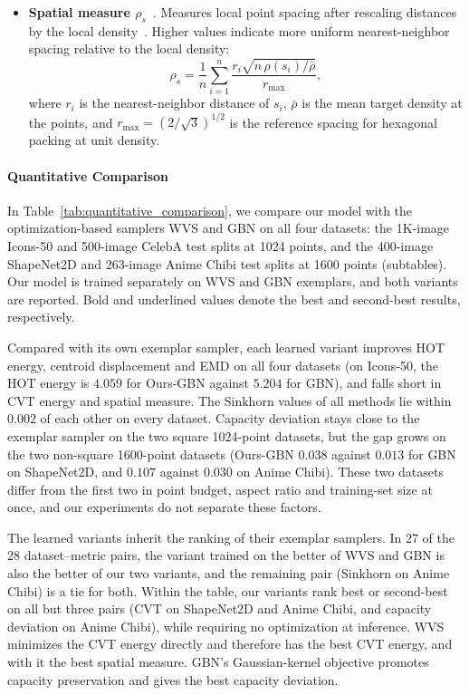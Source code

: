 \documentclass{egpubl}
\begin{document}
\begin{itemize}
\item \textbf{Spatial measure $\rho_s$}~\cite{lagae2008}. Measures local point spacing after rescaling distances by the local density~\cite{10.1145/2010324.1964945}. Higher values indicate more uniform nearest-neighbor spacing relative to the local density:
$$
\rho_s=\frac{1}{n}\sum_{i=1}^{n}
\frac{r_i\sqrt{n\,\rho(s_i)/\bar{\rho}}}{r_{\max}},
$$
where $r_i$ is the nearest-neighbor distance of $s_i$, $\bar{\rho}$ is the mean target density at the points, and $r_{\max}=(2/\sqrt{3})^{1/2}$ is the reference spacing for hexagonal packing at unit density.

\end{itemize}



\paragraph{Quantitative Comparison}




In Table~\ref{tab:quantitative_comparison}, we compare our model with the optimization-based samplers WVS and GBN on all four datasets: the 1K-image Icons-50 and 500-image CelebA test splits at 1024 points, and the 400-image ShapeNet2D and 263-image Anime Chibi test splits at 1600 points (subtables). Our model is trained separately on WVS and GBN exemplars, and both variants are reported. Bold and underlined values denote the best and second-best results, respectively. 

Compared with its own exemplar sampler, each learned variant improves HOT energy, centroid displacement and EMD on all four datasets (on Icons-50, the HOT energy is $4.059$ for Ours-GBN against $5.204$ for GBN), and falls short in CVT energy and spatial measure. The Sinkhorn values of all methods lie within $0.002$ of each other on every dataset. Capacity deviation stays close to the exemplar sampler on the two square 1024-point datasets, but the gap grows on the two non-square 1600-point datasets (Ours-GBN $0.038$ against $0.013$ for GBN on ShapeNet2D, and $0.107$ against $0.030$ on Anime Chibi). These two datasets differ from the first two in point budget, aspect ratio and training-set size at once, and our experiments do not separate these factors.

The learned variants inherit the ranking of their exemplar samplers. In 27 of the 28 dataset--metric pairs, the variant trained on the better of WVS and GBN is also the better of our two variants, and the remaining pair (Sinkhorn on Anime Chibi) is a tie for both. Within the table, our variants rank best or second-best on all but three pairs (CVT on ShapeNet2D and Anime Chibi, and capacity deviation on Anime Chibi), while requiring no optimization at inference. WVS minimizes the CVT energy directly and therefore has the best CVT energy, and with it the best spatial measure. GBN's Gaussian-kernel objective promotes capacity preservation and gives the best capacity deviation.
\end{document}
